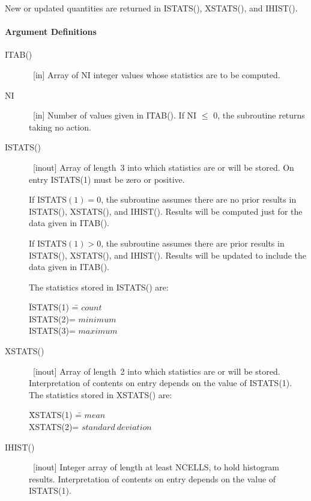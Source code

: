 \documentclass[twoside]{MATH77}
\begin{document}
New or updated quantities are returned in ISTATS(), XSTATS(), and IHIST().

\paragraph{Argument Definitions}

\begin{description}
\item[ITAB()]  \ [in] Array of NI integer values whose statistics are to be
computed.

\item[NI]  \ [in] Number of values given in ITAB(). If NI $\leq $ 0, the
subroutine returns taking no action.

\item[ISTATS()]  \ [inout] Array of length~3 into which statistics are or
will be stored. On entry ISTATS(1) must be zero or positive.

If ISTATS$(1)=0$, the subroutine assumes there are no prior results in
ISTATS(), XSTATS(), and IHIST(). Results will be computed just for the data
given in ITAB().

If ISTATS$(1)>0$, the subroutine assumes there are prior results in
ISTATS(), XSTATS(), and IHIST(). Results will be updated to include the data
given in ITAB().

The statistics stored in ISTATS() are:

\begin{tabbing}
\hspace{.5in}\=ISTATS(1) \== $count$\\
\>ISTATS(2)\>= $minimum$\\
\>ISTATS(3)\>= $maximum$
\end{tabbing}

\item[XSTATS()]  \ [inout] Array of length~2 into which statistics are or
will be stored. Interpretation of contents on entry depends on the value of
ISTATS(1). The statistics stored in XSTATS() are:

\begin{tabbing}
\hspace{.5in}\=XSTATS(1) \== $mean$\\
\>XSTATS(2)\>= $standard\ deviation$
\end{tabbing}

\item[IHIST()]  \ [inout] Integer array of length at least NCELLS, to hold
histogram results. Interpretation of contents on entry depends on the value
of ISTATS(1).


\end{description}
\end{document}
